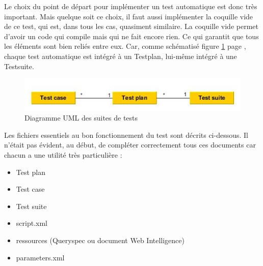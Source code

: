 Le choix du point de d\'{e}part pour impl\'{e}menter un test automatique est donc tr\`{e}s important. Mais quelque soit ce choix, il faut aussi impl\'{e}menter la coquille vide de ce test, qui est, dans tous les cas, quasiment similaire. La coquille vide permet d'avoir un code qui compile mais qui ne fait encore rien. Ce qui garantit que tous les \'{e}l\'{e}ments sont bien reli\'{e}s entre eux. Car, comme sch\'{e}matis\'{e} figure \ref{figure:testsRelations} page \pageref{figure:testsRelations}, chaque test automatique est int\'{e}gr\'{e} \`{a} un \gls{Testplan}, lui-m\^{e}me int\'{e}gr\'{e} \`{a} une \gls{Testsuite}.\\
\begin{figure}[!ht]
  \centering
      \includegraphics[width=\textwidth]{images/testsRelations.jpg}
  \caption{Diagramme UML des suites de tests}
	\label{figure:testsRelations}
\end{figure}

Les fichiers essentiels au bon fonctionnement du test sont d\'{e}crits ci-dessous. Il n'\'{e}tait pas \'{e}vident, au d\'{e}but, de compl\'{e}ter correctement tous ces documents car chacun a une utilit\'{e} tr\`{e}s particuli\`{e}re :
\begin{itemize}
	\item Test plan
	\item Test case
	\item Test suite
	\item script.xml
	\item ressources (\gls{Queryspec} ou document Web Intelligence)
	\item parameters.xml
\end{itemize}


